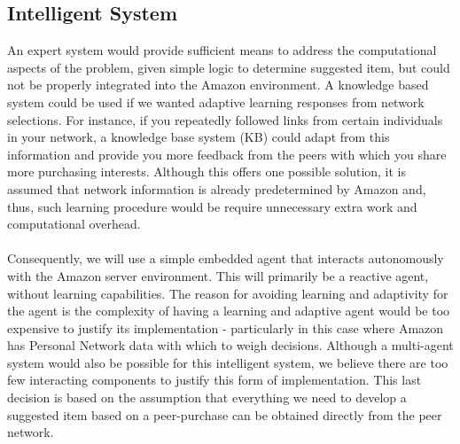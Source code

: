 \documentclass[12pt,a4paper]{article}
\begin{document}
	\subsection*{Intelligent System}
		An expert system would provide sufficient means to address the computational aspects of the problem, given simple logic to determine suggested item, but could not be properly integrated into the Amazon environment. A knowledge based system could be used if we wanted adaptive learning responses from network selections. For instance, if you repeatedly followed links from certain individuals in your network, a knowledge base system (KB) could adapt from this information and provide you more feedback from the peers with which you share more purchasing interests. Although this offers one possible solution, it is assumed that network information is already predetermined by Amazon and, thus, such learning procedure would be require unnecessary extra work and computational overhead. 
		\\\\
		Consequently, we will use a simple embedded agent that interacts autonomously with the Amazon server environment. This will primarily be a reactive agent, without learning capabilities. The reason for avoiding learning and adaptivity for the agent is the complexity of having a learning and adaptive agent would be too expensive to justify its implementation - particularly in this case where Amazon has Personal Network data with which to weigh decisions. Although a multi-agent system would also be possible for this intelligent system, we believe there are too few interacting components to justify this form of implementation. This last decision is based on the assumption that everything we need to develop a suggested item based on a peer-purchase can be obtained directly from the peer network. 
		\\\\
\end{document}
